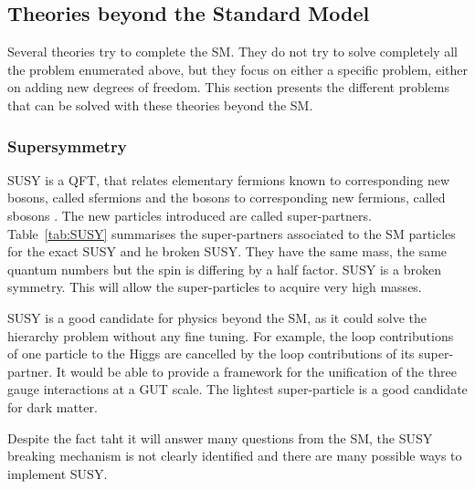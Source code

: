     \subsection{Theories beyond the Standard Model}

      Several theories try to complete the \gls{SM}. 
      They do not try to solve completely all the problem enumerated above, but they focus on either a specific problem, either on adding new degrees of freedom.
      This section presents the different problems that can be solved with these theories beyond the \gls{SM}.

      \subsubsection{Supersymmetry}
    
      \gls{SUSY} is a \gls{QFT}, that relates elementary fermions known to corresponding new bosons, called sfermions and the bosons to corresponding new fermions, called sbosons \cite{Signer2009}.
      The new particles introduced are called super-partners.
      Table~\ref{tab:SUSY} summarises the super-partners associated to the \gls{SM} particles for the exact \gls{SUSY} and he broken \gls{SUSY}.
      They have the same mass, the same quantum numbers but the spin is differing by a half factor.
      \gls{SUSY} is a broken symmetry. 
      This will allow the super-particles to acquire very high masses.

      \gls{SUSY} is a good candidate for physics beyond the \gls{SM}, as it could solve the hierarchy problem without any fine tuning.
      For example, the loop contributions of one particle to the Higgs are cancelled by the loop contributions of its super-partner.
      It would be able to provide a framework for the unification of the three gauge interactions at a GUT scale.
      The lightest super-particle is a good candidate for dark matter.

      Despite the fact taht it will answer many questions from the \gls{SM}, the \gls{SUSY} breaking mechanism is not clearly identified and there are many possible ways to implement \gls{SUSY}.
      
